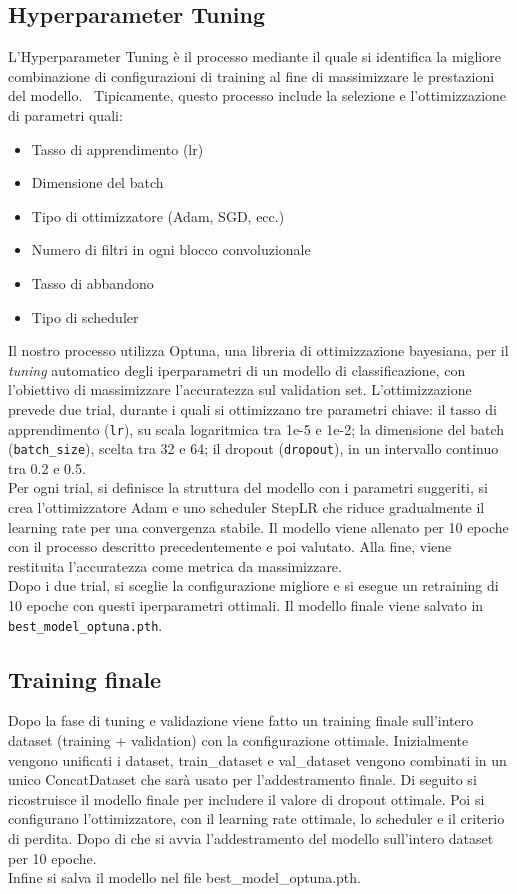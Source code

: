 \documentclass[main.tex]{subfiles}
\begin{document}
\subsection{Hyperparameter Tuning}

L'Hyperparameter Tuning è il processo mediante il quale si identifica la migliore combinazione di configurazioni di training al fine di massimizzare le prestazioni del modello. 
\noindent
Tipicamente, questo processo include la selezione e l'ottimizzazione di parametri quali:

\begin{itemize}
    \item Tasso di apprendimento (lr)
    \item Dimensione del batch
    \item Tipo di ottimizzatore (Adam, SGD, ecc.)
    \item Numero di filtri in ogni blocco convoluzionale
    \item Tasso di abbandono
    \item Tipo di scheduler
\end{itemize}
\noindent
Il nostro processo utilizza Optuna, una libreria di ottimizzazione bayesiana, per il \textit{tuning} automatico degli iperparametri di un modello di classificazione, con l’obiettivo di massimizzare l’accuratezza sul validation set. L’ottimizzazione prevede due trial, durante i quali si ottimizzano tre parametri chiave: il tasso di apprendimento (\texttt{lr}), su scala logaritmica tra 1e-5 e 1e-2; la dimensione del batch (\texttt{batch\_size}), scelta tra 32 e 64; il dropout (\texttt{dropout}), in un intervallo continuo tra 0.2 e 0.5.\\
\noindent
Per ogni trial, si definisce la struttura del modello con i parametri suggeriti, si crea l’ottimizzatore Adam e uno scheduler StepLR che riduce gradualmente il learning rate per una convergenza stabile. Il modello viene allenato per 10 epoche con il processo descritto precedentemente e poi valutato. Alla fine, viene restituita l’accuratezza come metrica da massimizzare.\\
\noindent
Dopo i due trial, si sceglie la configurazione migliore e si esegue un retraining di 10 epoche con questi iperparametri ottimali. Il modello finale viene salvato in \texttt{best\_model\_optuna.pth}.


\subsection{Training finale}

Dopo la fase di tuning e validazione viene fatto un training finale sull'intero dataset (training + validation) con la configurazione ottimale. Inizialmente vengono unificati i dataset, train\_dataset e val\_dataset vengono combinati in un unico ConcatDataset che sarà usato per l’addestramento finale. Di seguito si ricostruisce il modello finale per includere il valore di dropout ottimale. Poi si configurano l’ottimizzatore, con il learning rate ottimale, lo scheduler e il criterio di perdita. Dopo di che si avvia l’addestramento del modello sull’intero dataset per 10 epoche.\\
Infine si salva il modello nel file best\_model\_optuna.pth. 
\end{document}
